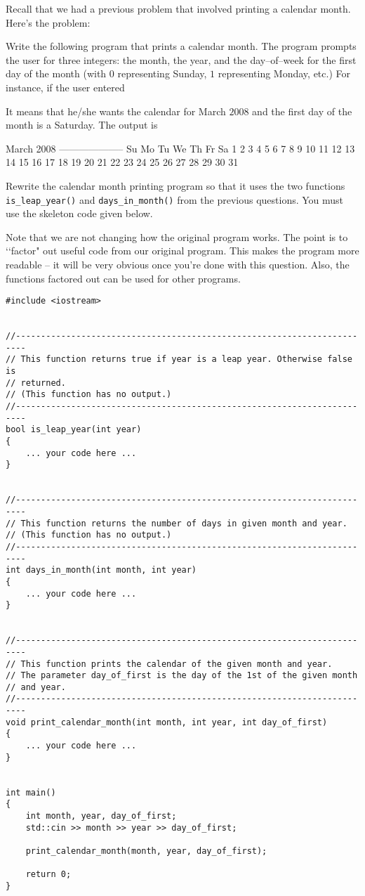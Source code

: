 Recall that we had a previous problem that involved printing a calendar month.
Here's the problem:

Write the following program that prints a calendar month.
The program prompts the user for three integers: the month, the year, and the
day--of--week for the first day of the month (with $0$ representing Sunday, $1$
representing Monday, etc.) For instance, if the user entered
\begin{console}[commandchars=\\\{\}]
\end{console}
It means that he/she wants the calendar for March $2008$ and the first day of
the month is a Saturday. The output is
\begin{console}
March 2008
--------------------
Su Mo Tu We Th Fr Sa  
                   1
 2  3  4  5  6  7  8
 9 10 11 12 13 14 15 
16 17 18 19 20 21 22
23 24 25 26 27 28 29
30 31
\end{console}

Rewrite the calendar month printing program so that it uses the two functions
\verb!is_leap_year()! and \verb!days_in_month()! from the previous questions.
You must use the skeleton code given below.

Note that we are not changing how the original program works. The point is to
\lq\lq factor" out useful code from our original program. This makes the
program more readable -- it will be very obvious once you're done with this
question. Also, the functions factored out can be used for other programs.

\begin{Verbatim}[frame=single]
#include <iostream>


//------------------------------------------------------------------------
// This function returns true if year is a leap year. Otherwise false is
// returned.
// (This function has no output.)
//------------------------------------------------------------------------
bool is_leap_year(int year)
{
    ... your code here ...
}


//------------------------------------------------------------------------
// This function returns the number of days in given month and year.
// (This function has no output.)
//------------------------------------------------------------------------
int days_in_month(int month, int year)
{
    ... your code here ...
}


//------------------------------------------------------------------------
// This function prints the calendar of the given month and year.
// The parameter day_of_first is the day of the 1st of the given month
// and year.
//------------------------------------------------------------------------
void print_calendar_month(int month, int year, int day_of_first)
{
    ... your code here ...
}
 

int main()
{
    int month, year, day_of_first;
    std::cin >> month >> year >> day_of_first;

    print_calendar_month(month, year, day_of_first);

    return 0;
}
\end{Verbatim}

